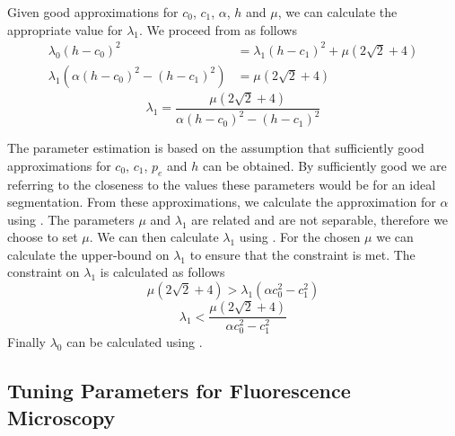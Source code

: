 \begin{definition} Given good approximations for $c_0$, $c_1$, $\alpha$, $h$ and $\mu$, we can calculate the appropriate value for $\lambda_1$. We proceed from  as follows
\begin{equation*}\begin{split}
	\lambda_0(h-c_0)^2 &= \lambda_1(h-c_1)^2 + \mu(2\sqrt{2}+4)\\
	\lambda_1 \left( \alpha(h-c_0)^2-(h-c_1)^2 \right) &= \mu(2\sqrt{2}+4)
\end{split}\end{equation*}
\begin{equation}
	\lambda_1 = \frac{\mu(2\sqrt{2}+4)}{\alpha(h-c_0)^2-(h-c_1)^2}
	\label{eq:lambda1approximation}
\end{equation}
\end{definition}

\begin{definition}
	The parameter estimation is based on the assumption that sufficiently good approximations for $c_0$, $c_1$, $p_e$ and $h$ can be obtained. By sufficiently good we are referring to the closeness to the values these parameters would be for an ideal segmentation. From these approximations, we calculate the approximation for $\alpha$ using . The parameters $\mu$ and $\lambda_1$ are related and are not separable, therefore we choose to set $\mu$. We can then calculate $\lambda_1$ using . For the chosen $\mu$ we can calculate the upper-bound on $\lambda_1$ to ensure that the constraint  is met. The constraint on $\lambda_1$ is calculated as follows
\begin{equation*}
\mu\left( 2\sqrt{2} + 4 \right) > \lambda_1(\alpha c_0^2 - c_1^2)
\end{equation*}
\begin{equation}
	\lambda_1 < \frac{\mu\left( 2\sqrt{2} + 4 \right)}{\alpha c_0^2 - c_1^2}
\end{equation}
Finally $\lambda_0$ can be calculated using .
\end{definition}

\subsection{Tuning Parameters for Fluorescence Microscopy}
\label{sec:cvgc_parameterestimation}

